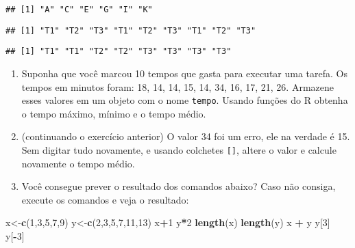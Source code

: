 \documentclass[
]{article}
\newenvironment{Shaded}{\begin{snugshade}}{\end{snugshade}}
\newcommand{\DecValTok}[1]{\textcolor[rgb]{0.00,0.00,0.81}{#1}}
\newcommand{\FunctionTok}[1]{\textcolor[rgb]{0.13,0.29,0.53}{\textbf{#1}}}
\newcommand{\NormalTok}[1]{#1}
\newcommand{\OtherTok}[1]{\textcolor[rgb]{0.56,0.35,0.01}{#1}}
\newcommand{\SpecialCharTok}[1]{\textcolor[rgb]{0.81,0.36,0.00}{\textbf{#1}}}
\begin{document}
\begin{verbatim}
## [1] "A" "C" "E" "G" "I" "K"
\end{verbatim}

\begin{verbatim}
## [1] "T1" "T2" "T3" "T1" "T2" "T3" "T1" "T2" "T3"
\end{verbatim}

\begin{verbatim}
## [1] "T1" "T1" "T2" "T2" "T3" "T3" "T3" "T3"
\end{verbatim}

\begin{enumerate}
\def\labelenumi{\arabic{enumi}.}
\setcounter{enumi}{9}
\item
  Suponha que você marcou 10 tempos que gasta para executar uma tarefa.
  Os tempos em minutos foram: 18, 14, 14, 15, 14, 34, 16, 17, 21, 26.
  Armazene esses valores em um objeto com o nome \texttt{tempo}. Usando
  funções do R obtenha o tempo máximo, mínimo e o tempo médio.
\item
  (continuando o exercício anterior) O valor 34 foi um erro, ele na
  verdade é 15. Sem digitar tudo novamente, e usando colchetes
  \texttt{{[}{]}}, altere o valor e calcule novamente o tempo médio.
\item
  Você consegue prever o resultado dos comandos abaixo? Caso não
  consiga, execute os comandos e veja o resultado:
\end{enumerate}

\begin{Shaded}
\begin{Highlighting}[]
\NormalTok{x}\OtherTok{\textless{}{-}}\FunctionTok{c}\NormalTok{(}\DecValTok{1}\NormalTok{,}\DecValTok{3}\NormalTok{,}\DecValTok{5}\NormalTok{,}\DecValTok{7}\NormalTok{,}\DecValTok{9}\NormalTok{)}
\NormalTok{y}\OtherTok{\textless{}{-}}\FunctionTok{c}\NormalTok{(}\DecValTok{2}\NormalTok{,}\DecValTok{3}\NormalTok{,}\DecValTok{5}\NormalTok{,}\DecValTok{7}\NormalTok{,}\DecValTok{11}\NormalTok{,}\DecValTok{13}\NormalTok{)}
\NormalTok{x}\SpecialCharTok{+}\DecValTok{1}
\NormalTok{y}\SpecialCharTok{*}\DecValTok{2}
\FunctionTok{length}\NormalTok{(x)}
\FunctionTok{length}\NormalTok{(y)}
\NormalTok{x }\SpecialCharTok{+}\NormalTok{ y}
\NormalTok{y[}\DecValTok{3}\NormalTok{]}
\NormalTok{y[}\SpecialCharTok{{-}}\DecValTok{3}\NormalTok{]}
\end{Highlighting}
\end{Shaded}
\end{document}
